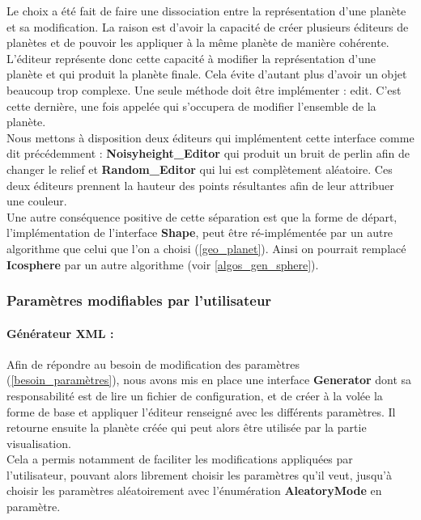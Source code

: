 \documentclass[a4paper]{article}
\begin{document}
Le choix a été fait de faire une dissociation entre la représentation d'une planète et sa modification. La raison est d'avoir la capacité de créer plusieurs éditeurs de planètes et de pouvoir les appliquer à la même planète de manière cohérente. L'éditeur représente donc cette capacité à modifier la représentation d'une planète et qui produit la planète finale. Cela évite d'autant plus d'avoir un objet beaucoup trop complexe. Une seule méthode doit être implémenter : edit. C'est cette dernière, une fois appelée qui s'occupera de modifier l'ensemble de la planète.\\
Nous mettons à disposition deux éditeurs qui implémentent cette interface comme dit précédemment : \textbf{Noisyheight\_Editor} qui produit un bruit de perlin afin de changer le relief et \textbf{Random\_Editor} qui lui est complètement aléatoire. Ces deux éditeurs prennent la hauteur des points résultantes afin de leur attribuer une couleur.\\
Une autre conséquence positive de cette séparation est que la forme de départ, l'implémentation de l'interface \textbf{Shape}, peut être ré-implémentée par un autre algorithme que celui que l'on a choisi (\ref{geo_planet}). Ainsi on pourrait remplacé \textbf{Icosphere} par un autre algorithme (voir \ref{algos_gen_sphere}).\\

\subsubsection{Paramètres modifiables par l'utilisateur}

\paragraph{Générateur XML :}

Afin de répondre au besoin de modification des paramètres (\ref{besoin_paramètres}), nous avons mis en place une interface \textbf{Generator} dont sa responsabilité est de lire un fichier de configuration, et de créer à la volée la forme de base et appliquer l'éditeur renseigné avec les différents paramètres.
Il retourne ensuite la planète créée qui peut alors être utilisée par la partie visualisation.\\
Cela a permis notamment de faciliter les modifications appliquées par l'utilisateur, pouvant alors librement choisir les paramètres qu'il veut, jusqu'à choisir les paramètres aléatoirement avec l'énumération \textbf{AleatoryMode} en paramètre.
\end{document}
